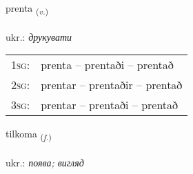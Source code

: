 \documentclass[frontgrid, backgrid]{flacards}\usepackage[]{graphicx}\usepackage[]{xcolor}
\begin{document}
\renewcommand{\flhead}{\vskip5pt \fboxsep=0pt {\small\bfseries\footnotesize Sagnorð | дієслово}}
\renewcommand{\fcfoot}{\vskip5pt \fboxsep=0pt \hspace{2pt}{\small\bfseries\footnotesize 3K}}

\renewcommand{\blhead}{\vskip5pt {\small\bfseries\footnotesize Sagnorð | дієслово }}
\renewcommand{\bcfoot}{\vskip5pt \hspace{2pt}{\small\bfseries\footnotesize 3K}}


{prenta \small{\textsubscript{(\textit{v.})}} \\[1ex] %
\textphonetic{[pʰrɛn̥ta]} \\
ukr.: \emph{друкувати} \\  [2ex]
\renewcommand*{\arraystretch}{0.8}
\begin{tabular}{p{1cm}l}
\textsc{1sg}: & prenta -- prentaði -- prentað \\ 
\textsc{2sg}: & prentar -- prentaðir -- prentað \\ 
\textsc{3sg}: & prentar -- prentaði -- prentað \\ 
\end{tabular}
}

\renewcommand{\flhead}{\vskip5pt \fboxsep=0pt {\small\bfseries\footnotesize Nafnorð | іменник}}
\renewcommand{\fcfoot}{\vskip5pt \fboxsep=0pt \hspace{2pt}{\small\bfseries\footnotesize 3K}}

\renewcommand{\blhead}{\vskip5pt {\small\bfseries\footnotesize Nafnorð | іменник }}
\renewcommand{\bcfoot}{\vskip5pt \hspace{2pt}{\small\bfseries\footnotesize 3K}}


{tilkoma \small{\textsubscript{(\textit{f.})}} \\[1ex] %
\textphonetic{[tʰɪlkʰɔma]} \\
ukr.: \emph{поява; вигляд} \\  [2ex]
\renewcommand*{\arraystretch}{0.8}
}
\end{document}
